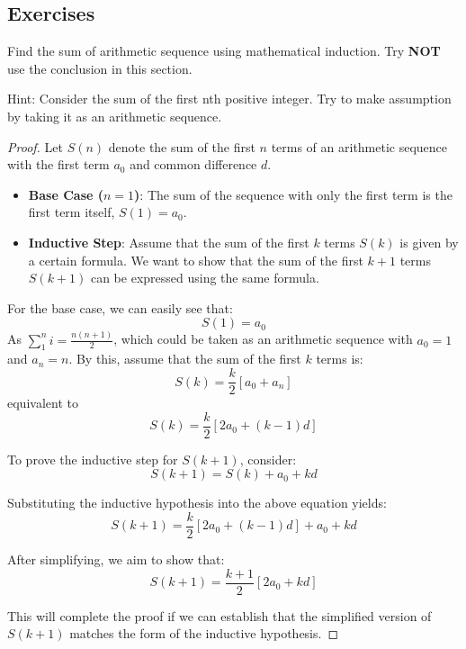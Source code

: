 \documentclass[
	12pt, %
	fleqn, %
	a4paper, %
]{LegrandOrangeBook}
\begin{document}
\subsection{Exercises}
\begin{exercise}
    Find the sum of arithmetic sequence using mathematical induction. Try \textbf{NOT} use the conclusion in this section.
\end{exercise}
Hint: Consider the sum of the first nth positive integer. Try to make assumption by taking it as an arithmetic sequence.
\begin{proof}
    Let \( S(n) \) denote the sum of the first \( n \) terms of an arithmetic sequence with the first term \( a_0 \) and common difference \( d \).
    \begin{itemize}
        \item \textbf{Base Case (\( n = 1 \))}: The sum of the sequence with only the first term is the first term itself, \( S(1) = a_0 \).
        \item \textbf{Inductive Step}: Assume that the sum of the first \( k \) terms \( S(k) \) is given by a certain formula. We want to show that the sum of the first \( k+1 \) terms \( S(k+1) \) can be expressed using the same formula.
        \end{itemize}
        
        For the base case, we can easily see that:
        \[
        S(1) = a_0
        \]
        As $\sum_{1}^{n}i = \frac{n(n+1)}{2}$, which could be taken as an arithmetic sequence with $a_0=1$ and
        $a_n=n$.
        By this, assume that the sum of the first \( k \) terms is:
        \[
        S(k) = \frac{k}{2} [a_0 + a_n]
        \]
        equivalent to
        \[
        S(k) = \frac{k}{2} [2a_0 + (k-1)d]
        \]
        
        To prove the inductive step for \( S(k+1) \), consider:
        \[
        S(k+1) = S(k) + a_0 + kd
        \]
        
        Substituting the inductive hypothesis into the above equation yields:
        \[
        S(k+1) = \frac{k}{2} [2a_0 + (k-1)d] + a_0 + kd
        \]
        
        After simplifying, we aim to show that:
        \[
        S(k+1) = \frac{k+1}{2} [2a_0 + kd]
        \]
        
        This will complete the proof if we can establish that the simplified version of \( S(k+1) \) matches the form of the inductive hypothesis.
\end{proof}
\end{document}
